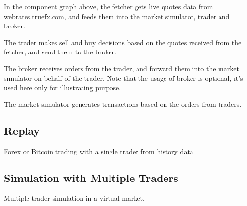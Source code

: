 In the component graph above, the fetcher gets live quotes data from \url{webrates.truefx.com}, and feeds them into the market simulator, trader and broker.

The trader makes sell and buy decisions based on the quotes received from the fetcher, and send them to the broker.

The broker receives orders from the trader, and forward them into the market simulator on behalf of the trader. Note that the usage of broker is optional, it's used here only for illustrating purpose.

The market simulator generates transactions based on the orders from traders.

\subsection{Replay}

Forex or Bitcoin trading with a single trader from history data

\subsection{Simulation with Multiple Traders}

Multiple trader simulation in a virtual market.
